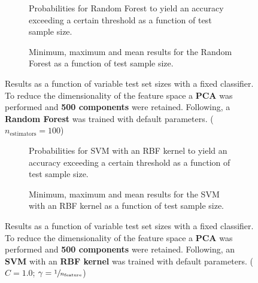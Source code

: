 \begin{figure}
    \captionsetup[subfigure]{justification=justified,singlelinecheck=false}
    \begin{subfigure}[t]{0.61\textwidth}
        
        \caption{Probabilities for Random Forest to yield an accuracy exceeding a certain threshold as a function of test sample size.}
    \end{subfigure}
    \hspace{3.0mm}
    \begin{subfigure}[t]{0.34\textwidth}
        
        \caption{Minimum, maximum and mean results for the Random Forest as a function of test sample size.}
    \end{subfigure}
    \caption[Effects of varying test sample size. Random Forest; Preprocessing: PCA ($n_\text{components} = \num{500}$)]{Results as a function of variable test set sizes with a fixed classifier. To reduce the dimensionality of the feature space a \textbf{PCA} was performed and \textbf{500 components} were retained. Following, a \textbf{{Random Forest}} was trained with default parameters. ($n_\text{estimators}=\num{100}$)}
    \label{fig:PCA_500_components_no_selection_RandomForest}
\end{figure}

\begin{figure}
    \captionsetup[subfigure]{justification=justified,singlelinecheck=false}
    \begin{subfigure}[t]{0.61\textwidth}
        
        \caption{Probabilities for SVM with an RBF kernel to yield an accuracy exceeding a certain threshold as a function of test sample size.}
    \end{subfigure}
    \hspace{3.0mm}
    \begin{subfigure}[t]{0.34\textwidth}
        
        \caption{Minimum, maximum and mean results for the SVM with an RBF kernel as a function of test sample size.}
    \end{subfigure}
    \caption[Effects of varying test sample size. SVM (kernel = RBF); Preprocessing: PCA ($n_\text{components} = \num{500}$)]{Results as a function of variable test set sizes with a fixed classifier. To reduce the dimensionality of the feature space a \textbf{PCA} was performed and \textbf{500 components} were retained. Following, an \textbf{{SVM}} with an \textbf{{RBF kernel}} was trained with default parameters. ($C=\num{1.0}$; $\gamma=\sfrac{1}{n_\text{feature}}$)}
    \label{fig:PCA_500_components_no_selection_SVC}
\end{figure}

